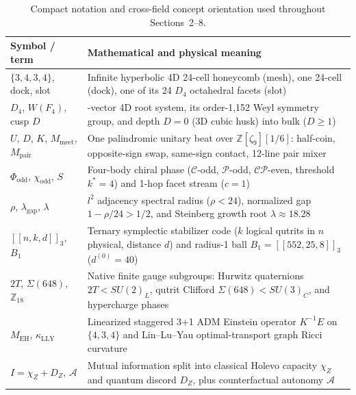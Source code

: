 \begin{table}[tb]
\centering
\caption{Compact notation and cross-field concept orientation used throughout Sections~2--8.}
\label{tab:notation-guide}
\footnotesize
\begin{tabularx}{\textwidth}{@{}>{\raggedright\arraybackslash}p{3.35cm}>{\raggedright\arraybackslash}X@{}}
\toprule
Symbol / term & Mathematical and physical meaning \\
\midrule
$\{3,4,3,4\}$, dock, slot & Infinite hyperbolic 4D 24-cell honeycomb (mesh), one 24-cell (dock), one of its 24 $D_4$ octahedral facets (slot) \\
$D_4$, $W(F_4)$, cusp $D$ & 24-vector 4D root system, its order-1,152 Weyl symmetry group, and depth $D = 0$ (3D cubic husk) into bulk ($D \ge 1$) \\
$U$, $D$, $K$, $M_{\mathrm{meet}}$, $M_{\mathrm{pair}}$ & One palindromic unitary beat over $\mathbb{Z}[\zeta_9][1/6]$: half-coin, opposite-sign swap, same-sign contact, 12-line pair mixer \\
$\Phi_{\mathrm{odd}}$, $\chi_{\mathrm{odd}}$, $S$ & Four-body chiral phase ($\mathcal{C}$-odd, $\mathcal{P}$-odd, $\mathcal{CP}$-even, threshold $k^* = 4$) and 1-hop facet stream ($c = 1$) \\
$\rho$, $\lambda_{\mathrm{gap}}$, $\lambda$ & $l^2$ adjacency spectral radius ($\rho < 24$), normalized gap $1 - \rho/24 > 1/2$, and Steinberg growth root $\lambda \approx 18.28$ \\
$[[n,k,d]]_3$, $B_1$ & Ternary symplectic stabilizer code ($k$ logical qutrits in $n$ physical, distance $d$) and radius-1 ball $B_1 = [[552,25,8]]_3$ ($d^{(0)} = 40$) \\
$2T$, $\Sigma(648)$, $\mathbb{Z}_{18}$ & Native finite gauge subgroups: Hurwitz quaternions $2T < SU(2)_L$, qutrit Clifford $\Sigma(648) < SU(3)_C$, and hypercharge phases \\
$M_{\mathrm{EH}}$, $\kappa_{\mathrm{LLY}}$ & Linearized staggered 3+1 ADM Einstein operator $K^{-1} E$ on $\{4,3,4\}$ and Lin--Lu--Yau optimal-transport graph Ricci curvature \\
$I = \chi_Z + D_Z$, $\mathcal{A}$ & Mutual information split into classical Holevo capacity $\chi_Z$ and quantum discord $D_Z$, plus counterfactual autonomy $\mathcal{A}$ \\
\bottomrule
\end{tabularx}
\end{table}
